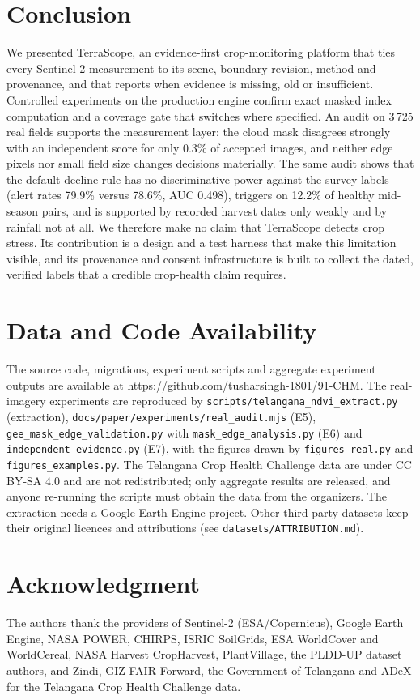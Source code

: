 \documentclass[conference]{IEEEtran}
\begin{document}
\section{Conclusion}
We presented TerraScope, an evidence-first crop-monitoring platform that ties every Sentinel-2 measurement to its scene, boundary revision, method and provenance, and that reports when evidence is missing, old or insufficient. Controlled experiments on the production engine confirm exact masked index computation and a coverage gate that switches where specified. An audit on 3\,725 real fields supports the measurement layer: the cloud mask disagrees strongly with an independent score for only 0.3\% of accepted images, and neither edge pixels nor small field size changes decisions materially. The same audit shows that the default decline rule has no discriminative power against the survey labels (alert rates 79.9\% versus 78.6\%, AUC 0.498), triggers on 12.2\% of healthy mid-season pairs, and is supported by recorded harvest dates only weakly and by rainfall not at all. We therefore make no claim that TerraScope detects crop stress. Its contribution is a design and a test harness that make this limitation visible, and its provenance and consent infrastructure is built to collect the dated, verified labels that a credible crop-health claim requires.

\section*{Data and Code Availability}
The source code, migrations, experiment scripts and aggregate experiment outputs are available at \url{https://github.com/tusharsingh-1801/91-CHM}. The real-imagery experiments are reproduced by \texttt{scripts/telangana\_ndvi\_extract.py} (extraction), \texttt{docs/paper/experiments/real\_audit.mjs} (E5), \texttt{gee\_mask\_edge\_validation.py} with \texttt{mask\_edge\_analysis.py} (E6) and \texttt{independent\_evidence.py} (E7), with the figures drawn by \texttt{figures\_real.py} and \texttt{figures\_examples.py}. The Telangana Crop Health Challenge data are under CC BY-SA 4.0 and are not redistributed; only aggregate results are released, and anyone re-running the scripts must obtain the data from the organizers. The extraction needs a Google Earth Engine project. Other third-party datasets keep their original licences and attributions (see \texttt{datasets/ATTRIBUTION.md}).

\section*{Acknowledgment}
The authors thank the providers of Sentinel-2 (ESA/Copernicus), Google Earth Engine, NASA POWER, CHIRPS, ISRIC SoilGrids, ESA WorldCover and WorldCereal, NASA Harvest CropHarvest, PlantVillage, the PLDD-UP dataset authors, and Zindi, GIZ FAIR Forward, the Government of Telangana and ADeX for the Telangana Crop Health Challenge data.



\end{document}
